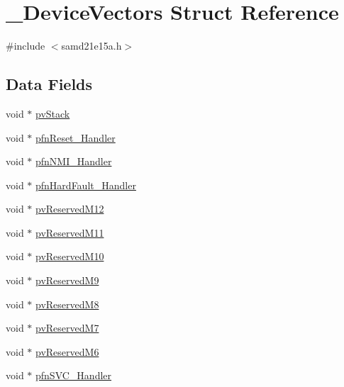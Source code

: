 \hypertarget{struct___device_vectors}{}\section{\+\_\+\+Device\+Vectors Struct Reference}
\label{struct___device_vectors}


{\ttfamily \#include $<$samd21e15a.\+h$>$}

\subsection*{Data Fields}
\begin{DoxyCompactItemize}
\item 
void $\ast$ \mbox{\hyperlink{struct___device_vectors_ae86e0a6e408113ef3b143f341d489669}{pv\+Stack}}
\item 
void $\ast$ \mbox{\hyperlink{struct___device_vectors_a745a6673bd6bd56e2e40f946fa55fc9c}{pfn\+Reset\+\_\+\+Handler}}
\item 
void $\ast$ \mbox{\hyperlink{struct___device_vectors_a3ffbc82863c70696f899d1896d07a108}{pfn\+N\+M\+I\+\_\+\+Handler}}
\item 
void $\ast$ \mbox{\hyperlink{struct___device_vectors_acae2d6b5d2083ab2557e52c68808659f}{pfn\+Hard\+Fault\+\_\+\+Handler}}
\item 
void $\ast$ \mbox{\hyperlink{struct___device_vectors_a18f8e47bb2d192e767964406bf1c77f6}{pv\+Reserved\+M12}}
\item 
void $\ast$ \mbox{\hyperlink{struct___device_vectors_aa5cdd2246c810dc340a77a2935dccf88}{pv\+Reserved\+M11}}
\item 
void $\ast$ \mbox{\hyperlink{struct___device_vectors_a34ff115f94b816277d805d543359e028}{pv\+Reserved\+M10}}
\item 
void $\ast$ \mbox{\hyperlink{struct___device_vectors_a322168920209c5f56130ea276728151e}{pv\+Reserved\+M9}}
\item 
void $\ast$ \mbox{\hyperlink{struct___device_vectors_ab06d86462218e0133d0300a88a276665}{pv\+Reserved\+M8}}
\item 
void $\ast$ \mbox{\hyperlink{struct___device_vectors_af369ad5ac6e5aa612c0e1d5afa0d7136}{pv\+Reserved\+M7}}
\item 
void $\ast$ \mbox{\hyperlink{struct___device_vectors_a350996f3b002d88d682eea2e6020f6d9}{pv\+Reserved\+M6}}
\item 
void $\ast$ \mbox{\hyperlink{struct___device_vectors_a21a5279599010749de97528068e0fe69}{pfn\+S\+V\+C\+\_\+\+Handler}}
\item 

\end{DoxyCompactItemize}
